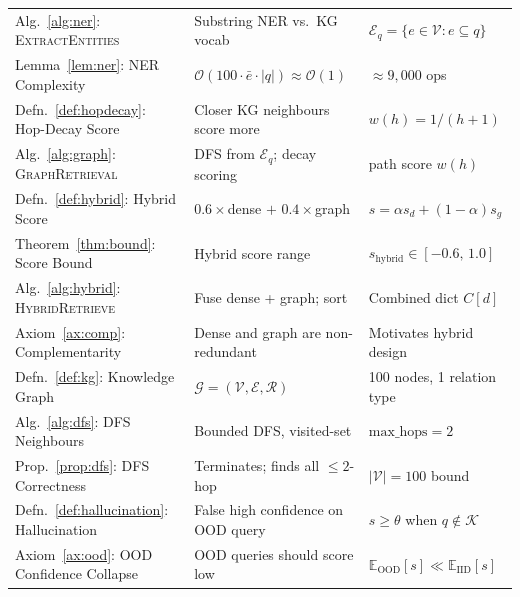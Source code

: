 \documentclass[12pt,a4paper]{article}
\theoremstyle{definition}
\theoremstyle{plain}
\theoremstyle{remark}
\begin{document}
\begin{longtable}{p{4.5cm} p{5.5cm} p{4.2cm}}
Alg.~\ref{alg:ner}: \textsc{ExtractEntities}
  & Substring NER vs.\ KG vocab
  & $\mathcal{E}_q=\{e\in\mathcal{V}:e\subseteq q\}$ \\[3pt]

Lemma~\ref{lem:ner}: NER Complexity
  & $\mathcal{O}(100\cdot\bar{e}\cdot|q|)\approx\mathcal{O}(1)$
  & $\approx 9{,}000$ ops \\[3pt]

Defn.~\ref{def:hopdecay}: Hop-Decay Score
  & Closer KG neighbours score more
  & $w(h)=1/(h{+}1)$ \\[3pt]

Alg.~\ref{alg:graph}: \textsc{GraphRetrieval}
  & DFS from $\mathcal{E}_q$; decay scoring
  & path score $w(h)$ \\[3pt]

Defn.~\ref{def:hybrid}: Hybrid Score
  & $0.6\times$dense $+$ $0.4\times$graph
  & $s = \alpha s_d + (1{-}\alpha)s_g$ \\[3pt]

Theorem~\ref{thm:bound}: Score Bound
  & Hybrid score range
  & $s_\text{hybrid}\in[-0.6,\,1.0]$ \\[3pt]

Alg.~\ref{alg:hybrid}: \textsc{HybridRetrieve}
  & Fuse dense + graph; sort
  & Combined dict $C[d]$ \\[3pt]

Axiom~\ref{ax:comp}: Complementarity
  & Dense and graph are non-redundant
  & Motivates hybrid design \\[3pt]

Defn.~\ref{def:kg}: Knowledge Graph
  & $\mathcal{G}=(\mathcal{V},\mathcal{E},\mathcal{R})$
  & 100 nodes, 1 relation type \\[3pt]

Alg.~\ref{alg:dfs}: DFS Neighbours
  & Bounded DFS, visited-set
  & $\text{max\_hops}=2$ \\[3pt]

Prop.~\ref{prop:dfs}: DFS Correctness
  & Terminates; finds all $\leq2$-hop
  & $|\mathcal{V}|=100$ bound \\[3pt]

Defn.~\ref{def:hallucination}: Hallucination
  & False high confidence on OOD query
  & $s\geq\theta$ when $q\notin\mathcal{K}$ \\[3pt]

Axiom~\ref{ax:ood}: OOD Confidence Collapse
  & OOD queries should score low
  & $\mathbb{E}_\text{OOD}[s]\ll\mathbb{E}_\text{IID}[s]$ \\[3pt]


\end{longtable}
\end{document}
